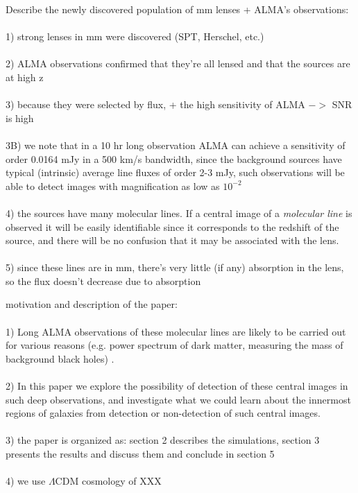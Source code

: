\documentclass[chicago]{emulateapj}
\begin{document}
\begin{framed}
Describe the newly discovered population of mm lenses + ALMA's observations: \\  \\
1) strong lenses in mm were discovered (SPT, Herschel, etc.) \\ \\
2) ALMA observations confirmed that they're all lensed and that the sources are at high z \\ \\
3) because they were selected by flux, + the high sensitivity of ALMA $->$ SNR is high \\ \\
3B) we note that in a 10 hr long observation ALMA can achieve a sensitivity of order 0.0164 mJy in a 500 km/s bandwidth, since the background sources have typical (intrinsic) average line fluxes of order 2-3 mJy, such observations will be able to detect images with magnification as low as $10^{-2}$ \\ \\
4) the sources have many molecular lines. If a central image of a \emph{molecular line} is observed it will be easily identifiable since it corresponds to the redshift of the source, and there will be no confusion that it may be associated with the lens. \\ \\
5) since these lines are in mm, there's very little (if any) absorption in the lens, so the flux doesn't decrease due to absorption
\end{framed}

\begin{framed}
motivation and description of the paper: \\ \\
1) Long ALMA observations of these molecular lines are likely to be carried out for various reasons (e.g. power spectrum of dark matter, measuring the mass of background black holes) .  \\ \\
2) In this paper we explore the possibility of detection of these central images in such deep observations, and investigate what we could learn about the innermost regions of galaxies from detection or non-detection of such central images.\\ \\
3) the paper is organized as: section 2 describes the simulations, section 3 presents the results and discuss them and conclude in section 5 \\ \\
4) we use $\Lambda$CDM cosmology of XXX
\end{framed}
\end{document}
